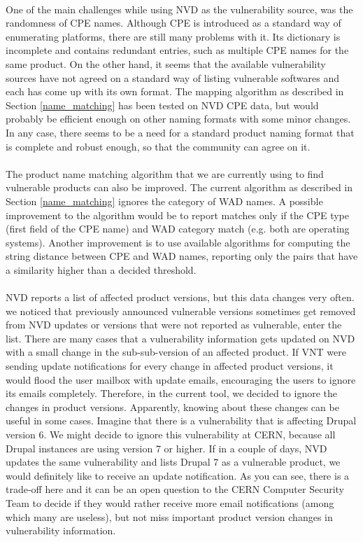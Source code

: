 \paragraph{}
One of the main challenges while using NVD as the vulnerability source, was the randomness of CPE names. Although CPE is introduced as a standard way of enumerating platforms, there are still many problems with it. Its dictionary is incomplete and contains redundant entries, such as multiple CPE names for the same product. On the other hand, it seems that the available vulnerability sources have not agreed on a standard way of listing vulnerable softwares and each has come up with its own format. The mapping algorithm as described in Section \ref{name_matching} has been tested on NVD CPE data, but would probably be efficient enough on other naming formats with some minor changes. In any case, there seems to be a need for a standard product naming format that is complete and robust enough, so that the community can agree on it.

\paragraph{}
The product name matching algorithm that we are currently using to find vulnerable products can also be improved. The current algorithm as described in Section \ref{name_matching} ignores the category of WAD names. A possible improvement to the algorithm would be to report matches only if the CPE type (first field of the CPE name) and WAD category match (e.g. both are operating systems). Another improvement is to use available algorithms for computing the string distance between CPE and WAD names, reporting only the pairs that have a similarity higher than a decided threshold.  
\paragraph{}
NVD reports a list of affected product versions, but this data changes very often. we noticed that previously announced vulnerable versions sometimes get removed from NVD updates or versions that were not reported as vulnerable, enter the list. There are many cases that a vulnerability information gets updated on NVD with a small change in the sub-sub-version of an affected product. If VNT were sending update notifications for every change in affected product versions, it would flood the user mailbox with update emails, encouraging the users to ignore its emails completely. Therefore, in the current tool, we decided to ignore the changes in product versions. Apparently, knowing about these changes can be useful in some cases. Imagine that there is a vulnerability that is affecting Drupal version 6. We might decide to ignore this vulnerability at CERN, because all Drupal instances are using version 7 or higher. If in a couple of days, NVD updates the same vulnerability and lists Drupal 7 as a vulnerable product, we would definitely like to receive an update notification. As you can see, there is a trade-off here and it can be an open question to the CERN Computer Security Team to decide if they would rather receive more email notifications (among which many are useless), but not miss important product version changes in vulnerability information.
